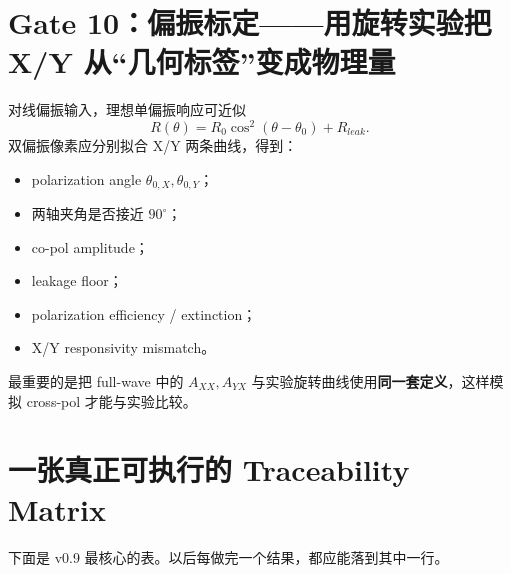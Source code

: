 \documentclass[11pt,a4paper,openany]{ctexrep}
\begin{document}
\section{Gate 10：偏振标定——用旋转实验把 X/Y 从“几何标签”变成物理量}

对线偏振输入，理想单偏振响应可近似
\[
R(\theta)=R_0\cos^2(\theta-\theta_0)+R_{leak}.
\]
双偏振像素应分别拟合 X/Y 两条曲线，得到：
\begin{itemize}
  \item polarization angle $\theta_{0,X},\theta_{0,Y}$；
  \item 两轴夹角是否接近 $90^\circ$；
  \item co-pol amplitude；
  \item leakage floor；
  \item polarization efficiency / extinction；
  \item X/Y responsivity mismatch。
\end{itemize}

最重要的是把 full-wave 中的 $A_{XX},A_{YX}$ 与实验旋转曲线使用\textbf{同一套定义}，这样模拟 cross-pol 才能与实验比较。

\section{一张真正可执行的 Traceability Matrix}

下面是 v0.9 最核心的表。以后每做完一个结果，都应能落到其中一行。
\end{document}
